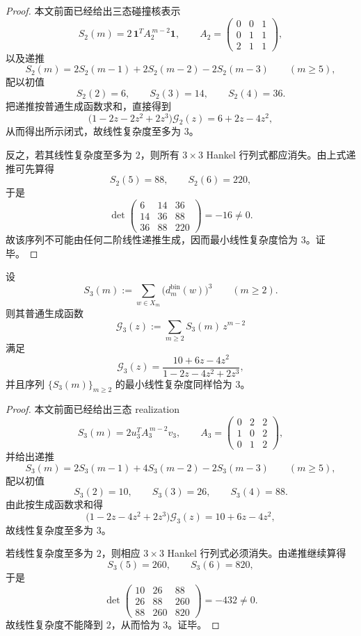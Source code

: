 \begin{proof}
本文前面已经给出三态碰撞核表示
\[
S_2(m)=2\,\mathbf 1^{\!T}A_2^{\,m-2}\mathbf 1,
\qquad
A_2=
\begin{pmatrix}
0&0&1\\
0&1&1\\
2&1&1
\end{pmatrix},
\]
以及递推
\[
S_2(m)=2S_2(m-1)+2S_2(m-2)-2S_2(m-3)
\qquad (m\ge 5),
\]
配以初值
\[
S_2(2)=6,\qquad S_2(3)=14,\qquad S_2(4)=36.
\]
把递推按普通生成函数求和，直接得到
\[
\bigl(1-2z-2z^2+2z^3\bigr)\mathcal G_2(z)=6+2z-4z^2,
\]
从而得出所示闭式，故线性复杂度至多为 \(3\)。

反之，若其线性复杂度至多为 \(2\)，则所有 \(3\times 3\) Hankel 行列式都应消失。由上式递推可先算得
\[
S_2(5)=88,\qquad S_2(6)=220,
\]
于是
\[
\det
\begin{pmatrix}
6&14&36\\
14&36&88\\
36&88&220
\end{pmatrix}
=-16\neq 0.
\]
故该序列不可能由任何二阶线性递推生成，因而最小线性复杂度恰为 \(3\)。证毕。
\end{proof}

\begin{theorem}[三阶碰撞核的最小线性复杂度]\label{thm:conclusion-foldbin-s3-minimal-linear-complexity-three}
设
\[
S_3(m):=\sum_{w\in X_m}\bigl(d_m^{\mathrm{bin}}(w)\bigr)^3
\qquad (m\ge 2).
\]
则其普通生成函数
\[
\mathcal G_3(z):=\sum_{m\ge 2}S_3(m)\,z^{m-2}
\]
满足
\[
\mathcal G_3(z)=\frac{10+6z-4z^2}{1-2z-4z^2+2z^3},
\]
并且序列 \(\{S_3(m)\}_{m\ge 2}\) 的最小线性复杂度同样恰为 \(3\)。
\end{theorem}

\begin{proof}
本文前面已经给出三态 realization
\[
S_3(m)=2u_3^{T}A_3^{\,m-2}v_3,
\qquad
A_3=
\begin{pmatrix}
0&2&2\\
1&0&2\\
0&1&2
\end{pmatrix},
\]
并给出递推
\[
S_3(m)=2S_3(m-1)+4S_3(m-2)-2S_3(m-3)
\qquad (m\ge 5),
\]
配以初值
\[
S_3(2)=10,\qquad S_3(3)=26,\qquad S_3(4)=88.
\]
由此按生成函数求和得
\[
\bigl(1-2z-4z^2+2z^3\bigr)\mathcal G_3(z)=10+6z-4z^2,
\]
故线性复杂度至多为 \(3\)。

若线性复杂度至多为 \(2\)，则相应 \(3\times 3\) Hankel 行列式必须消失。由递推继续算得
\[
S_3(5)=260,\qquad S_3(6)=820,
\]
于是
\[
\det
\begin{pmatrix}
10&26&88\\
26&88&260\\
88&260&820
\end{pmatrix}
=-432\neq 0.
\]
故线性复杂度不能降到 \(2\)，从而恰为 \(3\)。证毕。
\end{proof}


